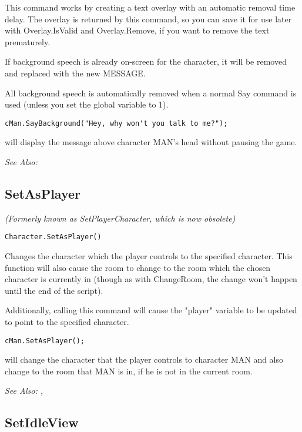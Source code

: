 This command works by creating a text overlay with an automatic removal time
delay. The overlay is returned by this command, so you can save it for
use later with Overlay.IsValid and Overlay.Remove, if you want to remove the
text prematurely.

If background speech is already on-screen for the character, it will be removed and
replaced with the new MESSAGE.

All background speech is automatically removed when a normal Say command
is used (unless you set the global variable  to 1).

\begin{verbatim}
cMan.SayBackground("Hey, why won't you talk to me?");
\end{verbatim}
will display the message above character MAN's head without pausing the game.

\it{See Also:} 


\subsection{SetAsPlayer}\label{Character.SetAsPlayer}%

\it{(Formerly known as SetPlayerCharacter, which is now obsolete)}

\begin{verbatim}
Character.SetAsPlayer()
\end{verbatim}
Changes the character which the player controls to the specified character.
This function will also cause the room to change to the room which the
chosen character is currently in (though as with ChangeRoom, the change won't
happen until the end of the script).

Additionally, calling this command will cause the "player" variable to be
updated to point to the specified character.

\begin{verbatim}
cMan.SetAsPlayer();
\end{verbatim}
will change the character that the player controls to character MAN and also change to the room
that MAN is in, if he is not in the current room.

\it{See Also:} ,


\subsection{SetIdleView}\label{Character.SetIdleView}%

